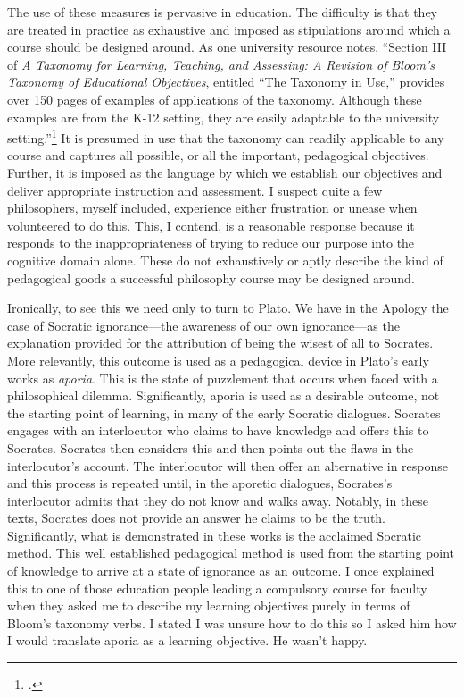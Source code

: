 \documentclass[letterpaper,notitlepage,12pt]{article}
\begin{document}
The use of these measures is pervasive in education.
The difficulty is that they are treated in practice as exhaustive and imposed as
stipulations around which a course should be designed around.  As one university
resource notes, ``Section III of \textit{A Taxonomy for Learning, Teaching, and
Assessing: A Revision of Bloom’s Taxonomy of Educational Objectives}, entitled
“The Taxonomy in Use,” provides over 150 pages of examples of applications of
the taxonomy. Although these examples are from the K-12 setting, they are easily
adaptable to the university setting.''\footcite{armstrong_blooms_nodate}
It is presumed in use that the taxonomy can readily applicable to any course and
captures all possible, or all the important, pedagogical objectives.
Further, it is imposed as the language by which we establish our objectives and
deliver appropriate instruction and assessment.
I suspect quite a few philosophers, myself included, experience either
frustration or unease when volunteered to do this.
This, I contend, is a reasonable response because it responds to the
inappropriateness of trying to reduce our purpose into the cognitive domain
alone.
These do not exhaustively or aptly describe the kind of pedagogical goods a
successful philosophy course may be designed around.

Ironically, to see this we need only to turn to Plato.
We have in the Apology the case of Socratic ignorance---the awareness of our own
ignorance---as the explanation provided for the attribution of being the wisest
of all to Socrates.
More relevantly, this outcome is used as a pedagogical device in Plato's early
works as \textit{aporia}.
This is the state of puzzlement that occurs when faced with a philosophical
dilemma.
Significantly, aporia is used as a desirable outcome, not the starting point of
learning, in many of the early Socratic dialogues.
Socrates engages with an interlocutor who claims to have knowledge and offers
this to Socrates.
Socrates then considers this and then points out the flaws in the interlocutor's
account.
The interlocutor will then offer an alternative in response and this process is
repeated until, in the aporetic dialogues, Socrates's interlocutor admits that
they do not know and walks away.
Notably, in these texts, Socrates does not provide an answer he claims to be the
truth.
Significantly, what is demonstrated in these works is the acclaimed Socratic
method.
This well established pedagogical method is used from the starting point of
knowledge to arrive at a state of ignorance as an outcome.
I once explained this to one of those education people leading a compulsory
course for faculty when they asked me to describe my learning objectives purely
in terms of Bloom's taxonomy verbs. 
I stated I was unsure how to do this so I asked him how I would translate aporia
as a learning objective.
He wasn't happy.
\end{document}
